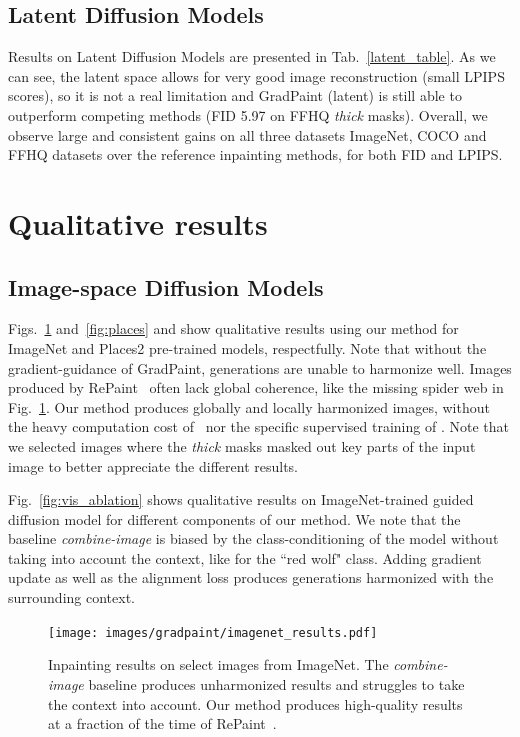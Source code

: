 \subsection{Latent Diffusion Models}

 Results on Latent Diffusion Models are presented in Tab.~\ref{latent_table}. As we can see, the latent space allows for very good image 
 reconstruction (small LPIPS scores), so it is not a real limitation and GradPaint (latent) is still able to outperform competing 
 methods (FID 5.97 on FFHQ \emph{thick} masks). Overall, we observe large and consistent gains on all three datasets ImageNet, 
 COCO and FFHQ datasets over the reference inpainting methods, for both FID and LPIPS.





\section{Qualitative results}

\subsection{Image-space Diffusion Models}

Figs.~\ref{fig:res2} and~\ref{fig:places} and  show qualitative results using our method for ImageNet and Places2 pre-trained models, 
respectfully. Note that without the gradient-guidance of GradPaint, generations are unable to harmonize well.
Images produced by RePaint~\citep{lugmayr2022repaint} often lack global coherence, like the missing spider web in Fig.~\ref{fig:res2}. 
Our method produces globally and locally harmonized images, without the heavy computation cost of~\cite{lugmayr2022repaint} nor the 
specific supervised training of \cite{lama}. Note that we selected images where the \textit{thick} masks masked out key parts 
of the input image to better appreciate the different results.

Fig.~\ref{fig:vis_ablation} shows qualitative results on ImageNet-trained 
 guided diffusion model for different components of our method. We note that the baseline \emph{combine-image} is
  biased by the class-conditioning of the model without taking into account the context, like for the ``red wolf" class. 
  Adding gradient update as well as the alignment loss produces generations harmonized with the surrounding context. 


\begin{figure}[H]
  \centering
    \texttt{[image: images/gradpaint/imagenet\_results.pdf]}
    \caption{Inpainting results on select images from ImageNet. The \emph{combine-image} baseline produces unharmonized results and struggles to take the context into account. Our method produces high-quality results at a fraction of the time of RePaint~\citep{lugmayr2022repaint}. }
    \label{fig:res2}
\end{figure}

